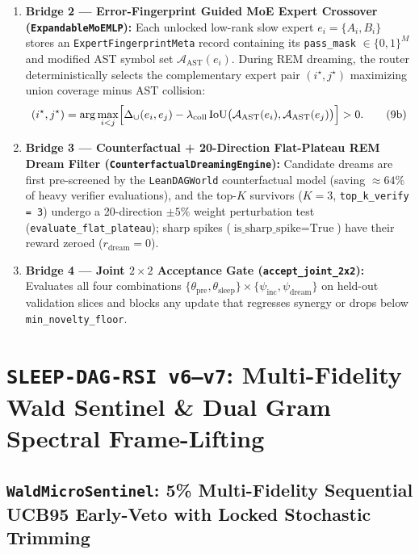 \documentclass[11pt,a4paper]{article}
\begin{document}
\begin{enumerate}
\item \textbf{Bridge 2 --- Error-Fingerprint Guided MoE Expert Crossover (\texttt{ExpandableMoEMLP}):}
Each unlocked low-rank slow expert $e_i = \{A_i, B_i\}$ stores an \texttt{ExpertFingerprintMeta} record containing its \texttt{pass\_mask} $\in \{0, 1\}^M$ and modified AST symbol set $\mathcal{A}_{\text{AST}}(e_i)$. During REM dreaming, the router deterministically selects the complementary expert pair $(i^\star, j^\star)$ maximizing union coverage minus AST collision:
\begin{equation}
(i^\star, j^\star) = \arg\max_{i < j} \Bigl[\Delta_{\cup}(e_i, e_j) - \lambda_{\text{coll}} \operatorname{IoU}\bigl(\mathcal{A}_{\text{AST}}(e_i), \mathcal{A}_{\text{AST}}(e_j)\bigr)\Bigr] > 0.
\tag{9b}\label{eq:moe_xover}
\end{equation}
\item \textbf{Bridge 3 --- Counterfactual + 20-Direction Flat-Plateau REM Dream Filter (\texttt{CounterfactualDreamingEngine}):}
Candidate dreams are first pre-screened by the \texttt{LeanDAGWorld} counterfactual model (saving $\approx 64\%$ of heavy verifier evaluations), and the top-$K$ survivors ($K = 3$, \texttt{top\_k\_verify = 3}) undergo a 20-direction $\pm 5\%$ weight perturbation test (\texttt{evaluate\_flat\_plateau}); sharp spikes ($\text{is\_sharp\_spike} = \text{True}$) have their reward zeroed ($r_{\text{dream}} = 0$).
\item \textbf{Bridge 4 --- Joint $2\times 2$ Acceptance Gate (\texttt{accept\_joint\_2x2}):}
Evaluates all four combinations $\{\theta_{\text{pre}}, \theta_{\text{sleep}}\} \times \{\psi_{\text{inc}}, \psi_{\text{dream}}\}$ on held-out validation slices and blocks any update that regresses synergy or drops below \texttt{min\_novelty\_floor}.
\end{enumerate}

\section{\texttt{SLEEP-DAG-RSI v6--v7}: Multi-Fidelity Wald Sentinel \& Dual Gram Spectral Frame-Lifting}
\label{sec:v6}

\subsection{\texttt{WaldMicroSentinel}: 5\% Multi-Fidelity Sequential UCB95 Early-Veto with Locked Stochastic Trimming}
\end{document}
